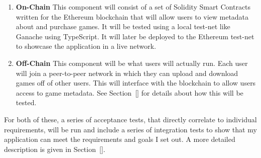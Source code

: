 \begin{enumerate}
  \item \textbf{On-Chain} This component will consist of a set of Solidity Smart Contracts written for the Ethereum blockchain that will allow users to view metadata about and purchase games. It will be tested using a local test-net like Ganache using TypeScript. It will later be deployed to the Ethereum test-net to showcase the application in a live network.
  \item \textbf{Off-Chain} This component will be what users will actually run. Each user will join a peer-to-peer network in which they can upload and download games off of other users. This will interface with the blockchain to allow users access to game metadata. See Section~\ref{} for details about how this will be tested.
\end{enumerate}

For both of these, a series of acceptance tests, that directly correlate to individual requirements, will be run and include a series of integration tests to show that my application can meet the requirements and goals I set out. A more detailed description is given in Section~\ref{}.

